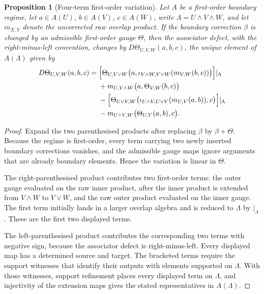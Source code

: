 \documentclass[11pt]{article}
\newtheorem{proposition}[theorem]{Proposition}
\begin{document}
\begin{proposition}[Four-term first-order variation]
Let \(A\) be a first-order boundary regime, let \(a\in A(U)\), \(b\in A(V)\), \(c\in A(W)\), write \(\Lambda=U\wedge V\wedge W\), and let \(m_{X,Y}\) denote the uncorrected raw overlap product. If the boundary correction \(\beta\) is changed by an admissible first-order gauge \(\Theta\), then the associator defect, with the right-minus-left convention, changes by \(D\Theta_{U,V,W}(a,b,c)\), the unique element of \(A(\Lambda)\) given by
\begin{align*}
D\Theta_{U,V,W}(a,b,c)
={}&
\Bigl[\Theta_{U,V\vee W}\bigl(a,\iota_{V\wedge W,V\vee W}(m_{V,W}(b,c))\bigr)\Bigr]\rvert_\Lambda \\
&+m_{U,V\wedge W}\bigl(a,\Theta_{V,W}(b,c)\bigr) \\
&-\Bigl[\Theta_{U\vee V,W}\bigl(\iota_{U\wedge V,U\vee V}(m_{U,V}(a,b)),c\bigr)\Bigr]\rvert_\Lambda \\
&-m_{U\wedge V,W}\bigl(\Theta_{U,V}(a,b),c\bigr).
\end{align*}
\end{proposition}

\begin{proof}
Expand the two parenthesised products after replacing \(\beta\) by \(\beta+\Theta\). Because the regime is first-order, every term carrying two newly inserted boundary corrections vanishes, and the admissible gauge maps ignore arguments that are already boundary elements. Hence the variation is linear in \(\Theta\).

The right-parenthesised product contributes two first-order terms: the outer gauge evaluated on the raw inner product, after the inner product is extended from \(V\wedge W\) to \(V\vee W\), and the raw outer product evaluated on the inner gauge. The first term initially lands in a larger overlap algebra and is reduced to \(\Lambda\) by \(\rvert_\Lambda\). These are the first two displayed terms.

The left-parenthesised product contributes the corresponding two terms with negative sign, because the associator defect is right-minus-left. Every displayed map has a determined source and target. The bracketed terms require the support witnesses that identify their outputs with elements supported on \(\Lambda\). With those witnesses, support refinement places every displayed term on \(\Lambda\), and injectivity of the extension maps gives the stated representatives in \(A(\Lambda)\).
\end{proof}
\end{document}
